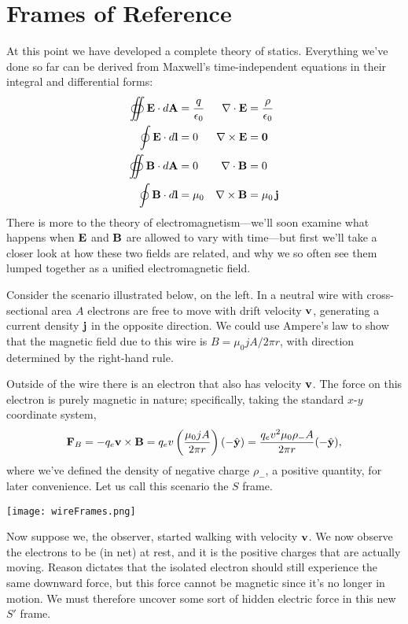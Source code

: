 \documentclass[../p051main.tex]{subfiles}
\begin{document}
\section{Frames of Reference}
At this point we have developed a complete theory of statics.
Everything we've done so far can be derived from Maxwell's time-independent equations in their integral and differential forms:
\begin{align*}
    \oiint \mathbf{E} \cdot d\mathbf{A} &= \frac{q}{\epsilon_0} & \nabla \cdot \mathbf{E} &= \frac{\rho}{\epsilon_0} \\
    \oint \mathbf{E} \cdot d\mathbf{l} &= 0 & \nabla \times \mathbf{E} &= \mathbf{0} \\
    \oiint \mathbf{B} \cdot d\mathbf{A} &= 0 & \nabla \cdot \mathbf{B} &= 0 \\
    \oint \mathbf{B} \cdot d\mathbf{l} &= \mu_0 & \nabla \times \mathbf{B} &= \mu_0 \,\mathbf{j}
\end{align*}
There is more to the theory of electromagnetism---we'll soon examine what happens when $\mathbf{E}$ and $\mathbf{B}$ are allowed to vary with time---but first we'll take a closer look at how these two fields are related, and why we so often see them lumped together as a unified electromagnetic field.

Consider the scenario illustrated below, on the left.
In a neutral wire with cross-sectional area $A$ electrons are free to move with drift velocity $\mathbf{v}$, generating a current density $\mathbf{j}$ in the opposite direction.
We could use Ampere's law to show that the magnetic field due to this wire is $B = \mu_0 jA / 2\pi r$, with direction determined by the right-hand rule.

Outside of the wire there is an electron that also has velocity $\mathbf{v}$.
The force on this electron is purely magnetic in nature; specifically, taking the standard $x$-$y$ coordinate system,
\[ \mathbf{F}_B = -q_e \mathbf{v} \times \mathbf{B} = q_e v \left( \frac{\mu_0 jA}{2\pi r} \right) (-\hat{\mathbf{y}}) = \frac{q_e v^2 \mu_0 \rho_- A}{2\pi r} (-\hat{\mathbf{y}}), \]
where we've defined the density of negative charge $\rho_-$, a positive quantity, for later convenience.
Let us call this scenario the $S$ frame.

\begin{center}
    \texttt{[image: wireFrames.png]}
\end{center}

Now suppose we, the observer, started walking with velocity $\mathbf{v}$.
We now observe the electrons to be (in net) at rest, and it is the positive charges that are actually moving.
Reason dictates that the isolated electron should still experience the same downward force, but this force cannot be magnetic since it's no longer in motion.
We must therefore uncover some sort of hidden electric force in this new $S'$ frame.
\end{document}
